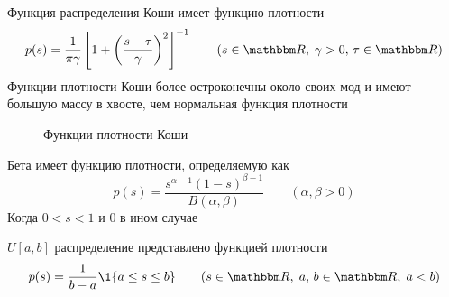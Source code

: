 \begin{frame}

    \vspace{2em}
    \Eg
    Функция распределения Коши имеет функцию плотности
    \begin{equation*}
        p(s) = 
        \frac{1}{\pi \gamma}
            \left[
                1 + \left( \frac{s - \tau}{\gamma} \right)^2
            \right]^{-1}
            \qquad (s \in \RR, \; \gamma > 0, \, \tau \in \RR)
    \end{equation*}
    Функции плотности Коши более остроконечны около своих мод и имеют большую массу в хвосте, чем нормальная функция плотности
    
\end{frame}

\begin{frame}

    \begin{figure}
   \begin{center}
    \caption{\label{f:cauchy_densities} Функции плотности Коши}
   \end{center}
    \end{figure}
    
\end{frame}

\begin{frame}

    \vspace{2em}
    \Eg
    Бета имеет функцию плотности, определяемую как
    \begin{equation*}
        p(s) = \frac{s^{\alpha-1} (1-s)^{\beta-1}}{B(\alpha, \beta)}
            \qquad (\alpha, \beta > 0)
    \end{equation*}
    Когда $0 < s < 1$ и $0$ в ином случае

\end{frame}


\begin{frame}

    \vspace{2em}
    \Eg
    $U[a, b]$ распределение представлено функцией плотности
    \begin{equation*}
        p(s) = \frac{1}{b - a} \1\{a \leq s \leq b\}
        \qquad (s \in \RR, \; a, \, b \in \RR, \; a < b)
    \end{equation*}
    
\end{frame}


